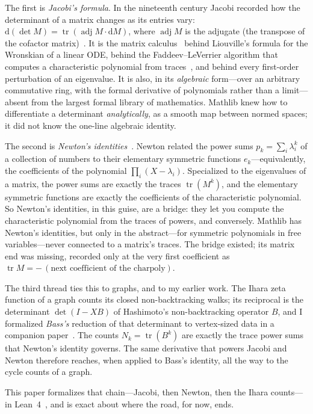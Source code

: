 \documentclass[11pt]{article}
\newcommand{\tr}{\operatorname{tr}}
\newcommand{\adj}{\operatorname{adj}}
\begin{document}
The first is \emph{Jacobi's formula}. In the nineteenth century Jacobi recorded how the determinant
of a matrix changes as its entries vary: $\mathrm{d}(\det M)=\tr(\adj M\cdot\mathrm{d}M)$, where
$\adj M$ is the adjugate (the transpose of the cofactor matrix)~\cite{HornJohnson}. It is the matrix
calculus~\cite{MagnusNeudecker} behind Liouville's formula for the Wronskian of a linear ODE, behind
the Faddeev--LeVerrier algorithm that computes a characteristic polynomial from traces~\cite{Hou1998},
and behind every first-order perturbation of an eigenvalue. It is also, in its \emph{algebraic} form---over an arbitrary commutative ring, with the
formal derivative of polynomials rather than a limit---absent from the largest formal library of
mathematics. Mathlib knew how to differentiate a determinant \emph{analytically}, as a smooth map
between normed spaces; it did not know the one-line algebraic identity.

The second is \emph{Newton's identities}~\cite{Macdonald}. Newton related the power sums
$p_k=\sum_i\lambda_i^k$ of a collection of numbers to their elementary symmetric functions
$e_k$---equivalently, the coefficients
of the polynomial $\prod_i(X-\lambda_i)$. Specialized to the eigenvalues of a matrix, the power sums
are exactly the traces $\tr(M^k)$, and the elementary symmetric functions are exactly the
coefficients of the characteristic polynomial. So Newton's identities, in this guise, are a bridge:
they let you compute the characteristic polynomial from the traces of powers, and conversely. Mathlib
has Newton's identities, but only in the abstract---for symmetric polynomials in free
variables---never connected to a matrix's traces. The bridge existed; its matrix end was missing,
recorded only at the very first coefficient as $\tr M=-\,(\text{next coefficient of the charpoly})$.

The third thread ties this to graphs, and to my earlier work. The Ihara zeta function of a graph
counts its closed non-backtracking walks; its reciprocal is the determinant $\det(I-XB)$ of
Hashimoto's non-backtracking operator $B$, and I formalized \emph{Bass's} reduction of that
determinant to vertex-sized data in a companion paper~\cite{IharaBass}. The counts $N_k=\tr(B^k)$ are
exactly the trace power sums that Newton's identity governs. The same derivative that powers Jacobi
and Newton therefore reaches, when applied to Bass's identity, all the way to the cycle counts of a
graph.

This paper formalizes that chain---Jacobi, then Newton, then the Ihara counts---in Lean~4~\cite{LeanFour}, and is
exact about where the road, for now, ends.
\end{document}

